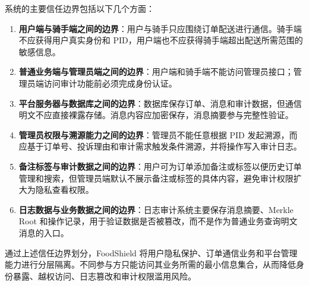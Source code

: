系统的主要信任边界包括以下几个方面：

\begin{enumerate}[label=\arabic*., leftmargin=2em]
\item \textbf{用户端与骑手端之间的边界}：用户与骑手只应围绕订单配送进行通信。骑手端不应获得用户真实身份和 PID，用户端也不应获得骑手端超出配送所需范围的敏感信息。
\item \textbf{普通业务端与管理员端之间的边界}：用户端和骑手端不能访问管理员接口；管理员端访问审计功能前必须完成身份认证。
\item \textbf{平台服务器与数据库之间的边界}：数据库保存订单、消息和审计数据，但通信明文不应直接裸露存储。消息内容应加密保存，消息摘要参与完整性验证。
\item \textbf{管理员权限与溯源能力之间的边界}：管理员不能任意根据 PID 发起溯源，而应基于订单号、投诉理由和审计需求触发条件溯源，并将操作写入审计日志。
\item \textbf{备注标签与审计数据之间的边界}：用户可为订单添加备注或标签以便历史订单管理和搜索，但管理员端默认不展示备注或标签的具体内容，避免审计权限扩大为隐私查看权限。
\item \textbf{日志数据与业务数据之间的边界}：日志审计系统主要保存消息摘要、Merkle Root 和操作记录，用于验证数据是否被篡改，而不是作为普通业务查询明文消息的入口。
\end{enumerate}

通过上述信任边界划分，FoodShield 将用户隐私保护、订单通信业务和平台管理能力进行分层隔离。不同参与方只能访问其业务所需的最小信息集合，从而降低身份暴露、越权访问、日志篡改和审计权限滥用风险。

